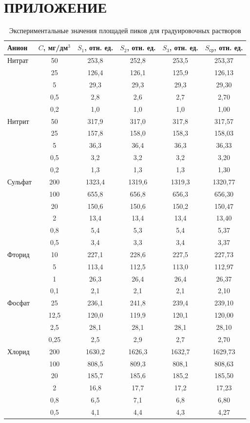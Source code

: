 \appendix
\chapter{ПРИЛОЖЕНИЕ}
\label{app:raw_calibration_data}

\begin{table}[H]
\centering
\caption{Экспериментальные значения площадей пиков для градуировочных растворов}
\label{tab:raw_calibration_data}
\begin{tabular}{|l|c|c|c|c|c|}
\hline
Анион & $C$, мг/дм$^3$ & $S_1$, отн. ед. & $S_2$, отн. ед. & $S_3$, отн. ед. & $S_{\text{ср}}$, отн. ед. \\ \hline
Нитрат & 50 & 253,8 & 252,8 & 253,5 & 253,37 \\
 & 25 & 126,4 & 126,1 & 125,9 & 126,13 \\
 & 5 & 29,3 & 29,3 & 29,3 & 29,30 \\
 & 0,5 & 2,8 & 2,6 & 2,7 & 2,70 \\
 & 0,2 & 1,0 & 1,0 & 1,0 & 1,00 \\
\hline
Нитрит & 50 & 317,9 & 317,0 & 317,8 & 317,57 \\
 & 25 & 157,8 & 158,0 & 158,3 & 158,03 \\
 & 5 & 36,3 & 36,4 & 36,3 & 36,33 \\
 & 0,5 & 3,2 & 3,2 & 3,2 & 3,20 \\
 & 0,2 & 1,3 & 1,3 & 1,3 & 1,30 \\
\hline
Сульфат & 200 & 1323,4 & 1319,6 & 1319,3 & 1320,77 \\
 & 100 & 655,8 & 656,8 & 656,3 & 656,30 \\
 & 20 & 150,6 & 150,6 & 150,2 & 150,47 \\
 & 2 & 13,4 & 13,4 & 13,4 & 13,40 \\
 & 0,8 & 5,4 & 5,3 & 5,4 & 5,37 \\
 & 0,5 & 3,4 & 3,3 & 3,4 & 3,37 \\
\hline
Фторид & 10 & 227,1 & 228,6 & 227,5 & 227,73 \\
 & 5 & 113,4 & 112,5 & 113,0 & 112,97 \\
 & 1 & 26,3 & 26,4 & 26,4 & 26,37 \\
 & 0,1 & 2,1 & 2,1 & 2,1 & 2,10 \\
\hline
Фосфат & 25 & 236,1 & 241,8 & 239,4 & 239,10 \\
 & 12,5 & 120,0 & 119,9 & 120,1 & 120,00 \\
 & 2,5 & 28,1 & 28,1 & 28,1 & 28,10 \\
 & 0,25 & 2,5 & 2,9 & 2,7 & 2,70 \\
\hline
Хлорид & 200 & 1630,2 & 1626,3 & 1632,7 & 1629,73 \\
 & 100 & 808,5 & 809,3 & 808,1 & 808,63 \\
 & 20 & 185,7 & 185,6 & 185,2 & 185,50 \\
 & 2 & 16,8 & 17,7 & 17,2 & 17,23 \\
 & 0,8 & 6,5 & 7,1 & 6,8 & 6,80 \\
 & 0,5 & 4,1 & 4,4 & 4,3 & 4,27 \\
\hline
\end{tabular}
\end{table}


